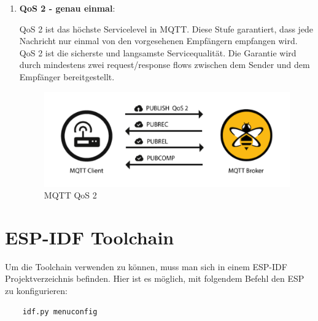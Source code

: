 \begin{enumerate}
    \item \textbf{QoS 2 - genau einmal}:
    
    QoS 2 ist das höchste Servicelevel in MQTT. Diese Stufe garantiert, dass jede Nachricht nur einmal von den vorgesehenen Empfängern empfangen wird. QoS 2 ist die sicherste und langsamste Servicequalität. Die Garantie wird durch mindestens zwei request/response flows zwischen dem Sender und dem Empfänger bereitgestellt. 

    \begin{figure}[H]
        \begin{center}
            \includegraphics[scale=0.8]{images/QoS-2.png}
            \caption{MQTT QoS 2 \cite{hivemq}}
        \end{center}
    \end{figure}
\end{enumerate}

\section{ESP-IDF Toolchain}\label{sec:esp-idf-toolchain}

Um die Toolchain verwenden zu können, muss man sich in einem ESP-IDF Projektverzeichnis befinden. Hier ist es möglich, mit folgendem Befehl den ESP zu konfigurieren:

\begin{verbatim}
    idf.py menuconfig
\end{verbatim}

